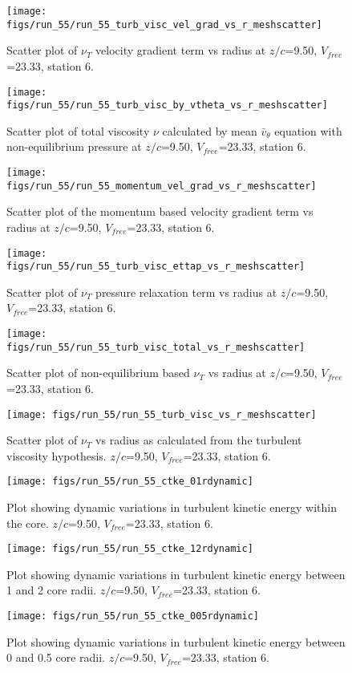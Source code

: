 \begin{figure}[H]
\centering
\texttt{[image: figs/run\_55/run\_55\_turb\_visc\_vel\_grad\_vs\_r\_meshscatter]}
\caption{Scatter plot of $\nu_T$ velocity gradient term vs radius at $z/c$=9.50, $V_{free}$=23.33, station 6.}
\end{figure}


\begin{figure}[H]
\centering
\texttt{[image: figs/run\_55/run\_55\_turb\_visc\_by\_vtheta\_vs\_r\_meshscatter]}
\caption{Scatter plot of total viscosity $\nu$ calculated by mean $\bar{v}_{\theta}$ equation with non-equilibrium pressure at $z/c$=9.50, $V_{free}$=23.33, station 6.}
\end{figure}


\begin{figure}[H]
\centering
\texttt{[image: figs/run\_55/run\_55\_momentum\_vel\_grad\_vs\_r\_meshscatter]}
\caption{Scatter plot of the momentum based velocity gradient term vs radius at $z/c$=9.50, $V_{free}$=23.33, station 6.}
\end{figure}


\begin{figure}[H]
\centering
\texttt{[image: figs/run\_55/run\_55\_turb\_visc\_ettap\_vs\_r\_meshscatter]}
\caption{Scatter plot of $\nu_T$ pressure relaxation term vs radius at $z/c$=9.50, $V_{free}$=23.33, station 6.}
\end{figure}


\begin{figure}[H]
\centering
\texttt{[image: figs/run\_55/run\_55\_turb\_visc\_total\_vs\_r\_meshscatter]}
\caption{Scatter plot of non-equilibrium based $\nu_T$ vs radius at $z/c$=9.50, $V_{free}$=23.33, station 6.}
\end{figure}


\begin{figure}[H]
\centering
\texttt{[image: figs/run\_55/run\_55\_turb\_visc\_vs\_r\_meshscatter]}
\caption{Scatter plot of $\nu_T$ vs radius as calculated from the turbulent viscosity hypothesis. $z/c$=9.50, $V_{free}$=23.33, station 6.}
\end{figure}


\begin{figure}[H]
\centering
\texttt{[image: figs/run\_55/run\_55\_ctke\_01rdynamic]}
\caption{Plot showing dynamic variations in turbulent kinetic energy within the core. $z/c$=9.50, $V_{free}$=23.33, station 6.}
\end{figure}


\begin{figure}[H]
\centering
\texttt{[image: figs/run\_55/run\_55\_ctke\_12rdynamic]}
\caption{Plot showing dynamic variations in turbulent kinetic energy between 1 and 2 core radii. $z/c$=9.50, $V_{free}$=23.33, station 6.}
\end{figure}


\begin{figure}[H]
\centering
\texttt{[image: figs/run\_55/run\_55\_ctke\_005rdynamic]}
\caption{Plot showing dynamic variations in turbulent kinetic energy between 0 and 0.5 core radii. $z/c$=9.50, $V_{free}$=23.33, station 6.}
\end{figure}


